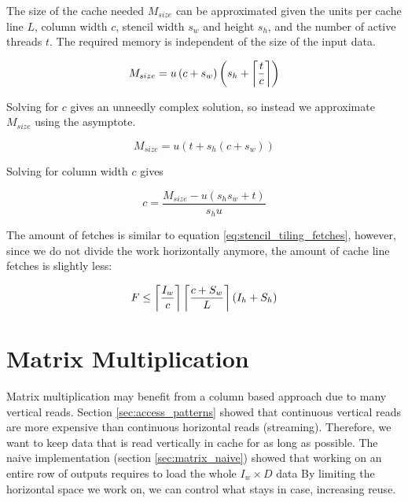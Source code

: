 The size of the cache needed $M_{size}$ can be approximated given the units per cache line $L$, column width $c$, stencil width $s_{w}$ and height $s_{h}$, and the number of active threads $t$. The required memory is independent of the size of the input data.

\[
    M_{size} = u \left(c + s_w\right) \left(s_h + \left\lceil \frac{t}{c} \right\rceil\right)
\]

Solving for $c$ gives an unneedly complex solution, so instead we approximate $M_{size}$ using the asymptote.

\[
    M_{size} = u \left(t + s_h \left(c + s_w\right)\right)
\]

Solving for column width $c$ gives 

\[
    c = \frac{M_{size} - u (s_h s_w + t)}{s_h u}
\]

The amount of fetches is similar to equation \ref{eq:stencil_tiling_fetches}, however, since we do not divide the work horizontally anymore, the amount of cache line fetches is slightly less:

\begin{equation}
    F \leq \left\lceil \frac{I_w}{c} \right\rceil\left\lceil \frac{c + S_w}{L} \right\rceil (I_h + S_h)
    \label{eq:stencil_column_fetches}
\end{equation}

\section{Matrix Multiplication}
Matrix multiplication may benefit from a column based approach due to many vertical reads.
Section \ref{sec:access_patterns} showed that continuous vertical reads are more expensive than continuous horizontal reads (streaming).
Therefore, we want to keep data that is read vertically in cache for as long as possible.
The naive implementation (section \ref{sec:matrix_naive}) showed that working on an entire row of outputs requires to load the whole $I_w \times D$ data
By limiting the horizontal space we work on, we can control what stays in case, increasing reuse.

